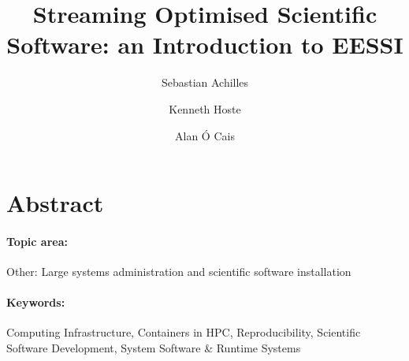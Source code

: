 \documentclass[a4paper,11pt]{article}
\begin{document}

\title{
    \textbf{\LARGE Streaming Optimised Scientific Software: an Introduction to EESSI}\\
}

\date{}

\author[1]{Sebastian Achilles}
\author[2]{Kenneth Hoste}
\author[3]{Alan \'O Cais}


\renewcommand\Authands{ and }

\maketitle


\section*{Abstract}


\paragraph{Topic area:} Other: Large systems administration and scientific software installation

\paragraph{Keywords:} Computing Infrastructure, Containers in HPC, Reproducibility, Scientific Software Development, System Software \& Runtime Systems



\newpage
 
\end{document}
